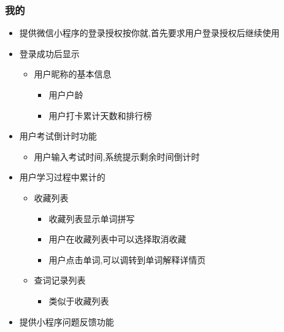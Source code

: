 \documentclass[
]{article}
\begin{document}
\hypertarget{ux6211ux7684-1}{%
\subsubsection{我的}\label{ux6211ux7684-1}}

\begin{itemize}
\item
  提供微信小程序的登录授权按你就,首先要求用户登录授权后继续使用
\item
  登录成功后显示

  \begin{itemize}
  \item
    用户昵称的基本信息

    \begin{itemize}
    \item
      用户户龄
    \item
      用户打卡累计天数和排行榜
    \end{itemize}
  \end{itemize}
\end{itemize}

\begin{itemize}
\item
  用户考试倒计时功能

  \begin{itemize}
  \item
    用户输入考试时间,系统提示剩余时间倒计时
  \end{itemize}
\item
  用户学习过程中累计的

  \begin{itemize}
  \item
    收藏列表

    \begin{itemize}
    \item
      收藏列表显示单词拼写
    \item
      用户在收藏列表中可以选择取消收藏
    \item
      用户点击单词,可以调转到单词解释详情页
    \end{itemize}
  \item
    查词记录列表

    \begin{itemize}
    \item
      类似于收藏列表
    \end{itemize}
  \end{itemize}
\item
  提供小程序问题反馈功能
\end{itemize}
\end{document}
